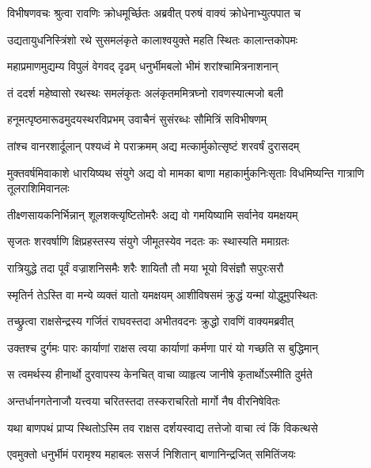 
\twolineshloka
{विभीषणवचः श्रुत्वा रावणिः क्रोधमूर्च्छितः}
{अब्रवीत् परुषं वाक्यं क्रोधेनाभ्युत्पपात च} %

\twolineshloka
{उद्यतायुधनिस्त्रिंशो रथे सुसमलंकृते}
{कालाश्वयुक्ते महति स्थितः कालान्तकोपमः} %

\twolineshloka
{महाप्रमाणमुद्यम्य विपुलं वेगवद् दृढम्}
{धनुर्भीमबलो भीमं शरांश्चामित्रनाशनान्} %

\twolineshloka
{तं ददर्श महेष्वासो रथस्थः समलंकृतः}
{अलंकृतममित्रघ्नो रावणस्यात्मजो बली} %

\twolineshloka
{हनूमत्पृष्ठमारूढमुदयस्थरविप्रभम्}
{उवाचैनं सुसंरब्धः सौमित्रिं सविभीषणम्} %

\twolineshloka
{तांश्च वानरशार्दूलान् पश्यध्वं मे पराक्रमम्}
{अद्य मत्कार्मुकोत्सृष्टं शरवर्षं दुरासदम्} %

\threelineshloka
{मुक्तवर्षमिवाकाशे धारयिष्यथ संयुगे}
{अद्य वो मामका बाणा महाकार्मुकनिःसृताः}
{विधमिष्यन्ति गात्राणि तूलराशिमिवानलः} %

\twolineshloka
{तीक्ष्णसायकनिर्भिन्नान् शूलशक्त्यृष्टितोमरैः}
{अद्य वो गमयिष्यामि सर्वानेव यमक्षयम्} %

\twolineshloka
{सृजतः शरवर्षाणि क्षिप्रहस्तस्य संयुगे}
{जीमूतस्येव नदतः कः स्थास्यति ममाग्रतः} %

\twolineshloka
{रात्रियुद्धे तदा पूर्वं वज्राशनिसमैः शरैः}
{शायितौ तौ मया भूयो विसंज्ञौ सपुरःसरौ} %

\twolineshloka
{स्मृतिर्न तेऽस्ति वा मन्ये व्यक्तं यातो यमक्षयम्}
{आशीविषसमं क्रुद्धं यन्मां योद्धुमुपस्थितः} %

\twolineshloka
{तच्छ्रुत्वा राक्षसेन्द्रस्य गर्जितं राघवस्तदा}
{अभीतवदनः क्रुद्धो रावणिं वाक्यमब्रवीत्} %

\twolineshloka
{उक्तश्च दुर्गमः पारः कार्याणां राक्षस त्वया}
{कार्याणां कर्मणा पारं यो गच्छति स बुद्धिमान्} %

\twolineshloka
{स त्वमर्थस्य हीनार्थो दुरवापस्य केनचित्}
{वाचा व्याहृत्य जानीषे कृतार्थोऽस्मीति दुर्मते} %

\twolineshloka
{अन्तर्धानगतेनाजौ यत्त्वया चरितस्तदा}
{तस्कराचरितो मार्गो नैष वीरनिषेवितः} %

\twolineshloka
{यथा बाणपथं प्राप्य स्थितोऽस्मि तव राक्षस}
{दर्शयस्वाद्य तत्तेजो वाचा त्वं किं विकत्थसे} %

\twolineshloka
{एवमुक्तो धनुर्भीमं परामृश्य महाबलः}
{ससर्ज निशितान् बाणानिन्द्रजित् समितिंजयः} %

